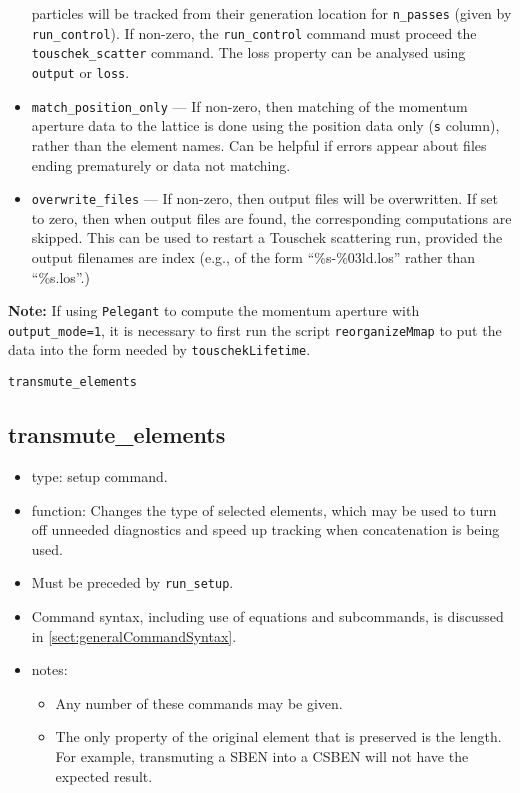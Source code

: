 \documentclass[11pt]{article}
\begin{document}
\begin{itemize}
   particles will be tracked from their generation location for \verb|n_passes| (given by \verb|run_control|). 
   If non-zero, the \verb|run_control| command must proceed the \verb |touschek_scatter| command.
   The loss property can be analysed using \verb|output| or \verb|loss|.
   \item \verb|match_position_only| --- If non-zero, then matching of the momentum aperture data to the lattice
     is done using the position data only (\verb|s| column), rather than the element names.  Can be helpful if
     errors appear about files ending prematurely or data not matching.
   \item \verb|overwrite_files| --- If non-zero, then output files will be overwritten.  If set to zero, then
     when output files are found, the corresponding computations are skipped.  This can be used to restart a
     Touschek scattering run, provided the output filenames are index (e.g., of the form ``\%s-\%03ld.los''
     rather than ``\%s.los''.)
\end{itemize}

{\bf Note:} If using \verb|Pelegant| to compute the momentum aperture with \verb|output_mode=1|, it is necessary to first run the script
  \verb|reorganizeMmap| to put the data into the form needed by \verb|touschekLifetime|.

\newpage
\begin{center}{\Large\verb|transmute_elements|}\end{center}
\subsection{transmute\_elements \label{subsec:transmuteelements}}

\begin{itemize}
\item type: setup command.
\item function: Changes the type of selected elements, which may be used to
	turn off unneeded diagnostics and speed up tracking when concatenation
	is being used.
\item Must be preceded by \verb|run_setup|.
\item Command syntax, including use of equations and subcommands, is discussed in \ref{sect:generalCommandSyntax}.
\item notes: 
	\begin{itemize}
	\item Any number of these commands may be given.
	\item The only property of the original element that is preserved is
	the length.  For example, transmuting a SBEN into a CSBEN will not
	have the expected result.
	\end{itemize}
\end{itemize}
\end{document}
